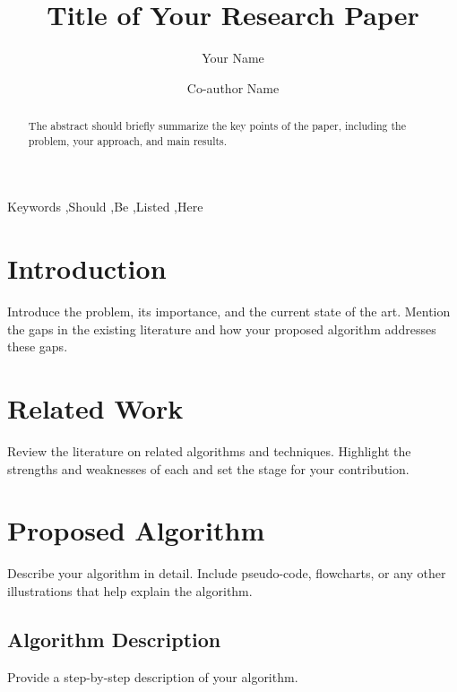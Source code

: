 \documentclass[twocolumn]{elsarticle}
\begin{document}
\begin{frontmatter}

\title{Title of Your Research Paper}

\author[inst1]{Your Name}
\author[inst2]{Co-author Name}

\begin{abstract}
    The abstract should briefly summarize the key points of the paper, including the problem, your approach, and main results.
\end{abstract}

\begin{keyword}
    Keywords \sep Should \sep Be \sep Listed \sep Here
\end{keyword}

\end{frontmatter}

\section{Introduction}
\label{sec:intro}
Introduce the problem, its importance, and the current state of the art. Mention the gaps in the existing literature and how your proposed algorithm addresses these gaps.

\section{Related Work}
\label{sec:related}
Review the literature on related algorithms and techniques. Highlight the strengths and weaknesses of each and set the stage for your contribution.

\section{Proposed Algorithm}
\label{sec:algorithm}
Describe your algorithm in detail. Include pseudo-code, flowcharts, or any other illustrations that help explain the algorithm.

\subsection{Algorithm Description}
Provide a step-by-step description of your algorithm.
\end{document}
